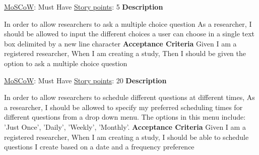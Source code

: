 \documentclass[12pt, a4paper]{report}
\begin{document}
\vspace*{20px}

\begin{tcolorbox}[width=\textwidth,colback={White},title={\textbf {Multiple Choice}},colbacktitle=grey,coltitle=black]
\underline{MoSCoW}: Must Have
\hfill
\underline {Story points}: 5
\newline
\newline
\blindtext \textbf{Description}
\newline

In order to allow researchers to ask a multiple choice question\newline
As a researcher,\newline
I should be allowed to input the different choices a user can choose in a single \newline
text box delimited by a new line character
\newline
\newline
 \textbf{Acceptance Criteria}
 \newline
Given I am a registered researcher,\newline
When I am creating a study,\newline
Then I should be given the option to ask a multiple choice question
\end{tcolorbox}  

\vspace*{20px}

\begin{tcolorbox}[width=\textwidth,colback={White},title={\textbf {Updating Scheduling UI}},colbacktitle=grey,coltitle=black]
\underline{MoSCoW}: Must Have
\hfill
\underline {Story points}: 20
\newline
\newline
\blindtext \textbf{Description}
\newline

In order to allow researchers to schedule different questions at different times,\newline
As a researcher,\newline
I should be allowed to specify my preferred scheduling times for different questions from a drop down menu. The options in this menu include: 'Just Once', 'Daily', 'Weekly', 'Monthly'.
\newline
\newline
 \textbf{Acceptance Criteria}
 \newline
Given I am a registered researcher,\newline
When I am creating a study,\newline
I should be able to schedule questions I create based on a date and a frequency preference
\end{tcolorbox}  
\end{document}

